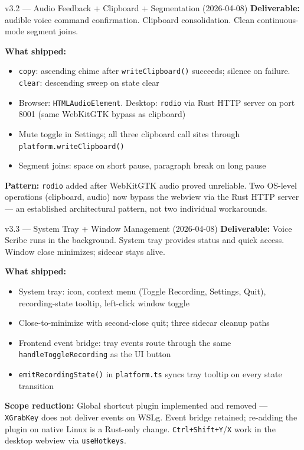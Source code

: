 \documentclass{beamer}
\begin{document}
\begin{frame}{v3.2 --- Audio Feedback + Clipboard + Segmentation (2026-04-08)}
    \small
    \textbf{Deliverable:} audible voice command confirmation. Clipboard consolidation.
    Clean continuous-mode segment joins.

    \vspace{0.2em}
    \textbf{What shipped:}
    \begin{itemize}\setlength{\itemsep}{0pt}
        \item \texttt{copy}: ascending chime after \texttt{writeClipboard()} succeeds;
              silence on failure. \texttt{clear}: descending sweep on state clear
        \item Browser: \texttt{HTMLAudioElement}. Desktop: \texttt{rodio} via Rust
              HTTP server on port 8001 (same WebKitGTK bypass as clipboard)
        \item Mute toggle in Settings; all three clipboard call sites through
              \texttt{platform.writeClipboard()}
        \item Segment joins: space on short pause, paragraph break on long pause
    \end{itemize}

    \vspace{0.1em}
    {\footnotesize\textbf{Pattern:} \texttt{rodio} added after WebKitGTK audio proved
    unreliable. Two OS-level operations (clipboard, audio) now bypass the webview
    via the Rust HTTP server --- an established architectural pattern, not two
    individual workarounds.}
\end{frame}


\begin{frame}{v3.3 --- System Tray + Window Management (2026-04-08)}
    \small
    \textbf{Deliverable:} Voice Scribe runs in the background. System tray provides
    status and quick access. Window close minimizes; sidecar stays alive.

    \vspace{0.2em}
    \textbf{What shipped:}
    \begin{itemize}\setlength{\itemsep}{0pt}
        \item System tray: icon, context menu (Toggle Recording, Settings, Quit),
              recording-state tooltip, left-click window toggle
        \item Close-to-minimize with second-close quit; three sidecar cleanup paths
        \item Frontend event bridge: tray events route through the same
              \texttt{handleToggleRecording} as the UI button
        \item \texttt{emitRecordingState()} in \texttt{platform.ts} syncs tray
              tooltip on every state transition
    \end{itemize}

    {\footnotesize\textbf{Scope reduction:} Global shortcut plugin implemented and removed ---
    \texttt{XGrabKey} does not deliver events on WSLg. Event bridge retained;
    re-adding the plugin on native Linux is a Rust-only change.
    \texttt{Ctrl+Shift+Y}/\texttt{X} work in the desktop webview via \texttt{useHotkeys}.}
\end{frame}
\end{document}
